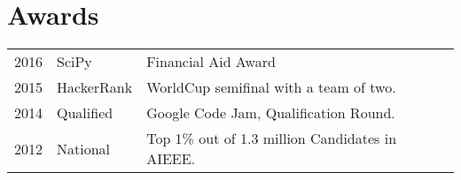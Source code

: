 \documentclass[]{deedy-resume-openfont}
\begin{document}
\begin{minipage}[t]{0.66\textwidth}









\section{Awards} 
\begin{tabular}{rll}
2016	     & SciPy  & Financial Aid Award\\
2015	     & HackerRank  & WorldCup semifinal with a team of two.\\
2014	     & Qualified  & Google Code Jam, Qualification Round.\\
2012     & National & Top 1\% out of 1.3 million Candidates in AIEEE.\\
\end{tabular}
\sectionsep



\end{minipage}
\end{document}
